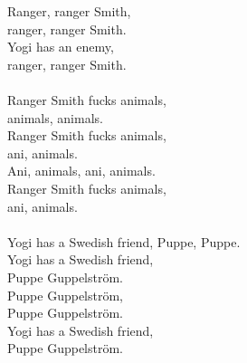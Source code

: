             Ranger, ranger Smith, \\
            ranger, ranger Smith.  \\
            Yogi has an enemy, \\
            ranger, ranger Smith. \\
\hspace{10mm} \\
            Ranger Smith fucks animals,  \\
            animals, animals.  \\
            Ranger Smith fucks animals, \\
            ani, animals. \\
            Ani, animals, ani, animals.  \\
            Ranger Smith fucks animals, \\
            ani, animals. \\
\hspace{10mm} \\
            Yogi has a Swedish friend, Puppe, Puppe. \\
            Yogi has a Swedish friend, \\
            Puppe Guppelström. \\
            Puppe Guppelström, \\
            Puppe Guppelström. \\
            Yogi has a Swedish friend, \\
            Puppe Guppelström. \\
\hspace{10mm} \\
